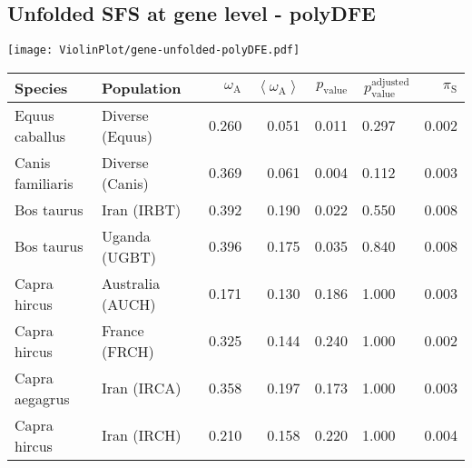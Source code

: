 \subsection{Unfolded SFS at gene level - polyDFE} 
\begin{center}
\texttt{[image: ViolinPlot/gene-unfolded-polyDFE.pdf]} 
\begin{adjustbox}{width = 1\textwidth}
\begin{tabular}{|l|l|r|r|r|r|r|}
\toprule
             Species &                      Population & $\omega_{\mathrm{A}}$ & $\left< \omega_{\mathrm{A}} \right>$ & $p_{\mathrm{value}}$ & $p_{\mathrm{value}}^{\mathrm{adjusted}}$ & $\pi_{\textrm{S}}$ \\
\midrule
      Equus caballus &                 Diverse (Equus) &                 0.260 &                                0.051 &                0.011 &                                  0.297~~ &              0.002 \\
    Canis familiaris &                 Diverse (Canis) &                 0.369 &                                0.061 &                0.004 &                                  0.112~~ &              0.003 \\
          Bos taurus &                     Iran (IRBT) &                 0.392 &                                0.190 &                0.022 &                                  0.550~~ &              0.008 \\
          Bos taurus &                   Uganda (UGBT) &                 0.396 &                                0.175 &                0.035 &                                  0.840~~ &              0.008 \\
        Capra hircus &                Australia (AUCH) &                 0.171 &                                0.130 &                0.186 &                                  1.000~~ &              0.003 \\
        Capra hircus &                   France (FRCH) &                 0.325 &                                0.144 &                0.240 &                                  1.000~~ &              0.002 \\
      Capra aegagrus &                     Iran (IRCA) &                 0.358 &                                0.197 &                0.173 &                                  1.000~~ &              0.003 \\
        Capra hircus &                     Iran (IRCH) &                 0.210 &                                0.158 &                0.220 &                                  1.000~~ &              0.004 \\

\end{tabular}
\end{adjustbox}
\end{center}
